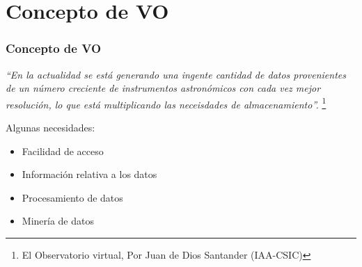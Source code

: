 \section{Concepto de VO}
\begin{frame}
\frametitle{Concepto de VO}
\emph{``En la actualidad se está generando una ingente cantidad de datos
provenientes de un número creciente de instrumentos astronómicos con cada vez
mejor resolución, lo que está multiplicando las neceisdades de almacenamiento''.}
\footnote{El Observatorio virtual, Por Juan de Dios Santander (IAA-CSIC)}

\vspace{0.3cm}
Algunas necesidades:
\newline
\begin{itemize}%
	\transdissolve
	\setlength{\itemindent}{1.0cm}
	\item <2->Facilidad de acceso
	\item <3->Información relativa a los datos
	\item <4->Procesamiento de datos
	\item <5->Minería de datos
\end{itemize}

\end{frame}

